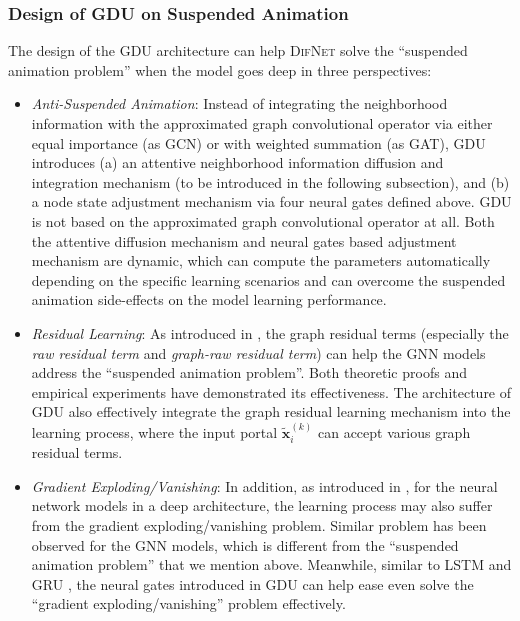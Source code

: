\documentclass{article}
\newcommand{\mb}{\mathbf}
\newcommand{\our}{\textsc{DifNet}}
\newcommand{\gdu}{\textsc{GDU}}
\newcommand{\gcn}{\textsc{GCN}}
\newcommand{\gat}{\textsc{GAT}}
\begin{document}
\subsubsection{Design of {\gdu} on Suspended Animation}

The design of the {\gdu} architecture can help {\our} solve the ``suspended animation problem'' when the model goes deep in three perspectives:

\begin{itemize}
\item \textit{Anti-Suspended Animation}: Instead of integrating the neighborhood information with the approximated graph convolutional operator via either equal importance (as {\gcn}) or with weighted summation (as {\gat}), {\gdu} introduces (a) an attentive neighborhood information diffusion and integration mechanism (to be introduced in the following subsection), and (b) a node state adjustment mechanism via four neural gates defined above. {\gdu} is not based on the approximated graph convolutional operator at all. Both the attentive diffusion mechanism and neural gates based adjustment mechanism are dynamic, which can compute the parameters automatically depending on the specific learning scenarios and can overcome the suspended animation side-effects on the model learning performance.

\item \textit{Residual Learning}: As introduced in \cite{Zhang_GResNet_19}, the graph residual terms (especially the \textit{raw residual term} and \textit{graph-raw residual term}) can help the GNN models address the ``suspended animation problem''. Both theoretic proofs and empirical experiments have demonstrated its effectiveness. The architecture of {\gdu} also effectively integrate the graph residual learning mechanism into the learning process, where the input portal $\tilde{\mb{x}}_i^{(k)}$ can accept various graph residual terms. 

\item \textit{Gradient Exploding/Vanishing}: In addition, as introduced in \cite{Hochreiter_Long_97}, for the neural network models in a deep architecture, the learning process may also suffer from the gradient exploding/vanishing problem. Similar problem has been observed for the GNN models, which is different from the ``suspended animation problem'' that we mention above. Meanwhile, similar to LSTM \cite{Hochreiter_Long_97} and GRU \cite{Chung_Empirical_14}, the neural gates introduced in {\gdu} can help ease even solve the ``gradient exploding/vanishing'' problem effectively.

\end{itemize}
\end{document}
